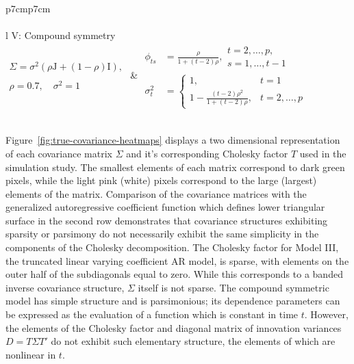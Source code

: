 \begin{table}[H]
\begin{tabular}{p{7cm}p{7cm}}
 \\
\hline
\\
 {l} {V: Compound symmetry} \\[0.3cm]
 $\begin{array}{l}\Sigma = \sigma^2\left(\rho \mathrm{J} + \left(1-\rho\right)\mathrm{I}\right),  \\
 \\
  \rho=0.7, \quad \sigma^2=1 \end{array}$  &  $\begin{aligned}
\phi_{ts} &= \frac{\rho}{1 + \left(t-2\right)\rho}, \begin{array}{l} t = 2, \dots, p,\\ 
				 s = 1, \dots, t-1 \end{array}\\
\sigma_t^2 &= \left\{\begin{array}{ll} 1, & t = 1\\ 1 -\frac{\left(t-2\right)\rho^2}{1 + \left(t-2\right)\rho}, & t = 2, \dots, p \end{array}\right.
\end{aligned}$ \\
 \\
\hline
\end{tabular} \label{table:simulation-model-list}
\end{table}


\bigskip

Figure~\ref{fig:true-covariance-heatmaps} displays a two dimensional representation of each covariance matrix $\Sigma$ and it's corresponding Cholesky factor $T$ used in the simulation study. The smallest elements of each matrix correspond to dark green pixels, while the light pink (white) pixels correspond to the large (largest) elements of the matrix. Comparison of the covariance matrices with the generalized autoregressive coefficient function which defines lower triangular surface in the second row demonstrates that covariance structures exhibiting sparsity or parsimony do not necessarily exhibit the same simplicity in the components of the Cholesky decomposition. The Cholesky factor for Model III, the truncated linear varying coefficient AR model, is sparse, with elements on the outer half of the subdiagonals equal to zero. While this corresponds to a banded inverse covariance structure, $\Sigma$ itself is not sparse.  The compound symmetric model has simple structure and is parsimonious; its dependence parameters can be expressed as the evaluation of a function which is constant in time $t$. However, the elements of the Cholesky factor and diagonal matrix of innovation variances $D = T \Sigma T'$ do not exhibit such elementary structure, the elements of which are nonlinear in $t$. 

